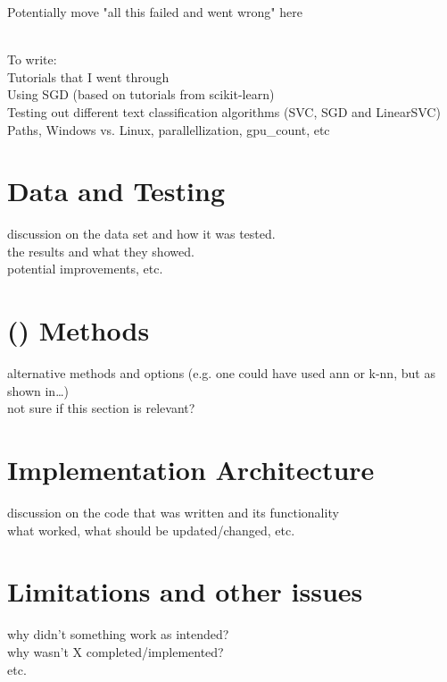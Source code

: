 \label{chap:chapter5}

Potentially move "all this failed and went wrong" here

~\\
To write: \\
Tutorials that I went through \\
Using SGD (based on tutorials from scikit-learn) \\
Testing out different text classification algorithms (SVC, SGD and LinearSVC) \\
Paths, Windows vs. Linux, parallellization, gpu\_count, etc

\section{Data and Testing}
\label{sec:data_and_testing}
discussion on the data set and how it was tested. \\
the results and what they showed.  \\
potential improvements, etc.

\section{ () Methods}
\label{sec:ai_methods}
alternative methods and options (e.g. one could have used ann or k-nn, but as shown in\ldots) \\
not sure if this section is relevant?

\section{Implementation Architecture}
\label{sec:implemented_architecture}
discussion on the code that was written and its functionality \\
what worked, what should be updated/changed, etc.

\section{Limitations and other issues}
\label{sec:limitations_and_issues}
why didn't something work as intended? \\
why wasn't X completed/implemented? \\
etc.
